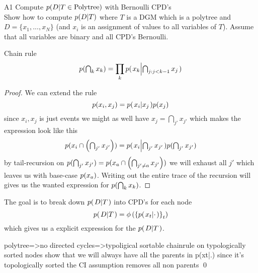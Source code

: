 \documentclass[a4paper,twoside=false,abstract=false,numbers=noenddot,
titlepage=false,headings=small,parskip=half,version=last]{scrartcl}
\begin{document}

\begin{exercise}{A1} Compute $p{(D|T\in{\text{Polytree}})}$ with Bernoulli
    CPD's \\
    Show how to compute $p{(D|T)}$ where $T$ is a DGM which is a polytree and
    $D = \{x_1,...,x_N\}$ (and $x_i$ is an assignment of values to all
    variables of $T$).
    Assume that all variables are binary and all CPD's Bernoulli.
\end{exercise}
\begin{solution}
    \begin{theorem} Chain rule
    \begin{equation}
        p{(\textstyle\bigcap_k
        x_k)}=\prod_kp{(\left. x_k \middle\vert \textstyle\bigcap_{j:j<k-1}x_j \right.)}
    \end{equation}
    \end{theorem}
    \begin{proof}
        We can extend the rule 
        \begin{equation}
            p{(x_i,x_j)} = p{(\left. x_i \middle\vert x_j \right.)}p{(x_j)} 
        \end{equation}
        since $x_i,x_j$ is just events we might as well have 
        $x_j=\bigcap_{j'}x_{j'}$ which makes the expression look like this
        \begin{equation}
            p{(x_i\cap \left(\textstyle\bigcap_{j'}x_{j'}\right))} =
           p{(\left. x_i \middle\vert \textstyle\bigcap_{j'}x_{j'} \right.)}
           p{(\textstyle\bigcap_{j'}x_{j'})}
        \end{equation}
        by tail-recursion on
        $p{(\bigcap_{j'}x_{j'})}=p{(x_a\cap\left(\bigcap_{j'\neq
        a}x_{j'}\right))}$ we will exhaust all $j'$ which leaves us with
        base-case $p{(x_a)}$. Writing out the entire trace of the recursion
        will gives us the wanted expression for $p{(\bigcap_k x_k)}$.
    \end{proof}
    The goal is to break down $p{(\left. D \middle\vert T \right.)}$ into CPD's for each node
    \begin{equation}
        p{(\left. D \middle\vert T \right.)} = \phi\left(
                            \left\{p{(\left. x_t \middle\vert \cdot \right.)}\right\}_t
                            \right)
    \end{equation}
    which gives us a explicit expression for the $p{(\left. D \middle\vert T \right.)}$.

    polytree=>no directed cycles=>typoligical sortable
    chainrule on typologically sorted nodes 
    show that we will always have all the parents in p(xt|.) since it's
    topologically sorted
    the CI assumption removes all non parents
    \qed


\end{solution}
\end{document}
